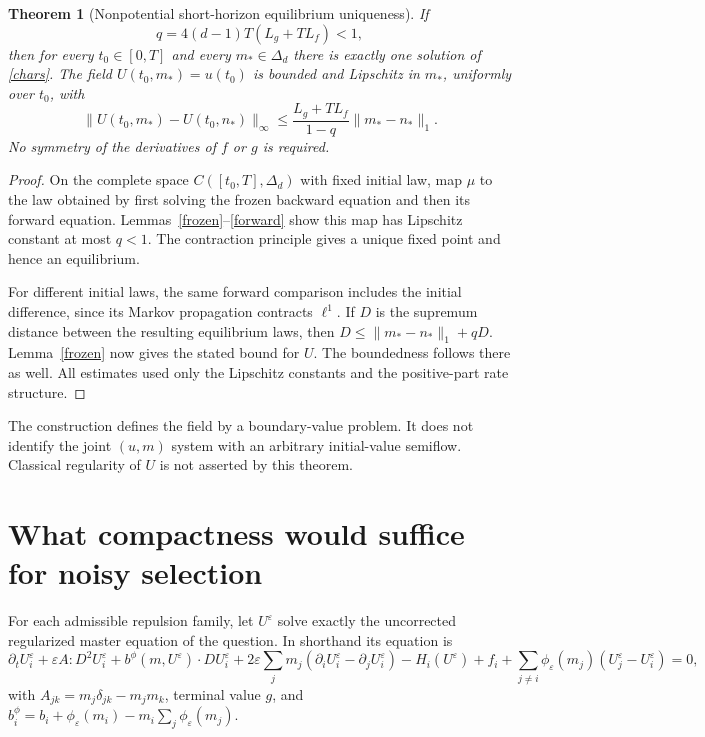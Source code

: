 \documentclass[11pt]{article}
\newtheorem{theorem}{Theorem}
\begin{document}
\begin{theorem}[Nonpotential short-horizon equilibrium uniqueness]\label{contract}
If
\begin{equation}\label{short}
 q=4(d-1)T(L_g+TL_f)<1,
\end{equation}
then for every $t_0\in[0,T]$ and every $m_*\in\Delta_d$ there is exactly one solution of \eqref{chars}. The field $U(t_0,m_*)=u(t_0)$ is bounded and Lipschitz in $m_*$, uniformly over $t_0$, with
\[
 \|U(t_0,m_*)-U(t_0,n_*)\|_\infty
 \le\frac{L_g+TL_f}{1-q}\|m_*-n_*\|_1.
\]
No symmetry of the derivatives of $f$ or $g$ is required.
\end{theorem}
\begin{proof}
On the complete space $C([t_0,T],\Delta_d)$ with fixed initial law, map $\mu$ to the law obtained by first solving the frozen backward equation and then its forward equation. Lemmas~\ref{frozen}--\ref{forward} show this map has Lipschitz constant at most $q<1$. The contraction principle gives a unique fixed point and hence an equilibrium.

For different initial laws, the same forward comparison includes the initial difference, since its Markov propagation contracts $\ell^1$. If $D$ is the supremum distance between the resulting equilibrium laws, then $D\le\|m_*-n_*\|_1+qD$. Lemma~\ref{frozen} now gives the stated bound for $U$. The boundedness follows there as well. All estimates used only the Lipschitz constants and the positive-part rate structure.
\end{proof}

The construction defines the field by a boundary-value problem. It does not identify the joint $(u,m)$ system with an arbitrary initial-value semiflow. Classical regularity of $U$ is not asserted by this theorem.

\section{What compactness would suffice for noisy selection}
For each admissible repulsion family, let $U^\varepsilon$ solve exactly the uncorrected regularized master equation of the question. In shorthand its equation is
\begin{equation}\label{viscous}
 \partial_tU_i^\varepsilon+\varepsilon A:D^2U_i^\varepsilon
 +b^\phi(m,U^\varepsilon)\cdot DU_i^\varepsilon
 +2\varepsilon\sum_jm_j(\partial_iU_i^\varepsilon-\partial_jU_i^\varepsilon)
 -H_i(U^\varepsilon)+f_i+\sum_{j\ne i}\phi_\varepsilon(m_j)(U_j^\varepsilon-U_i^\varepsilon)=0,
\end{equation}
with $A_{jk}=m_j\delta_{jk}-m_jm_k$, terminal value $g$, and
$b_i^\phi=b_i+\phi_\varepsilon(m_i)-m_i\sum_j\phi_\varepsilon(m_j)$.
\end{document}
